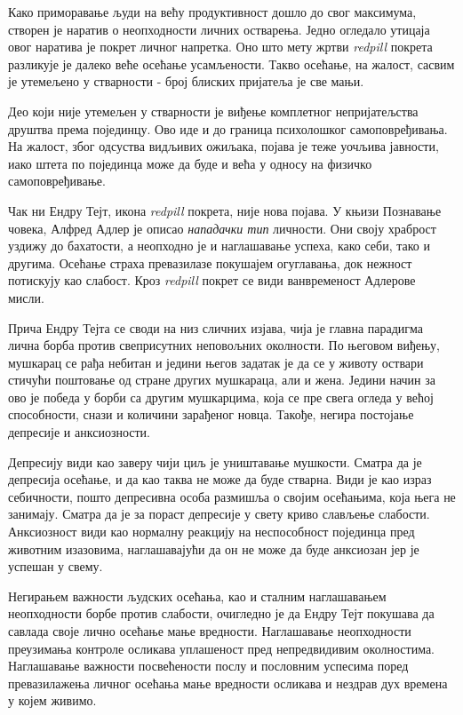 \documentclass[b5paper]{article}
\begin{document}
Како приморавање људи на већу продуктивност дошло до свог максимума, створен је наратив о неопходности личних остварења. Једно огледало утицаја овог наратива је покрет личног напретка. Оно што мету жртви \textit{redpill} покрета разликује је далеко веће осећање усамљености. Такво осећање, на жалост, сасвим је утемељено у стварности - број блиских пријатеља је све мањи.

Део који није утемељен у стварности је виђење комплетног непријатељства друштва према појединцу. Ово иде и до граница психолошког самоповређивања. На жалост, због одсуства видљивих ожиљака, појава је теже уочљива јавности, иако штета по појединца може да буде и већа у односу на физичко самоповређивање.

Чак ни Ендру Тејт, икона \textit{redpill} покрета, није нова појава. У књизи Познавање човека, Алфред Адлер је описао \textit{нападачки тип} личности. Они своју храброст уздижу до бахатости, а неопходно је и наглашавање успеха, како себи, тако и другима. Осећање страха превазилазе покушајем огуглавања, док нежност потискују као слабост. Кроз \textit{redpill} покрет се види ванвременост Адлерове мисли.

Прича Ендру Тејта се своди на низ сличних изјава, чија је главна парадигма лична борба против свеприсутних неповољних околности. По његовом виђењу, мушкарац се рађа небитан и једини његов задатак је да се у животу оствари стичући поштовање од стране других мушкараца, али и жена. Једини начин за ово је победа у борби са другим мушкарцима, која се пре свега огледа у већој способности, снази и количини зарађеног новца. Такође, негира постојање депресије и анксиозности.

Депресију види као заверу чији циљ је уништавање мушкости. Сматра да је депресија осећање, и да као таква не може да буде стварна. Види је као израз себичности, пошто депресивна особа размишља о својим осећањима, која њега не занимају. Сматра да је за пораст депресије у свету криво слављење слабости. Анксиозност види као нормалну реакцију на неспособност појединца пред животним изазовима, наглашавајући да он не може да буде анксиозан јер је успешан у свему.

Негирањем важности људских осећања, као и сталним наглашавањем неопходности борбе против слабости, очигледно је да Ендру Тејт покушава да савлада своје лично осећање мање вредности. Наглашавање неопходности преузимања контроле осликава уплашеност пред непредвидивим околностима. Наглашавање важности посвећености послу и пословним успесима поред превазилажења личног осећања мање вредности осликава и нездрав дух времена у којем живимо.
\end{document}
